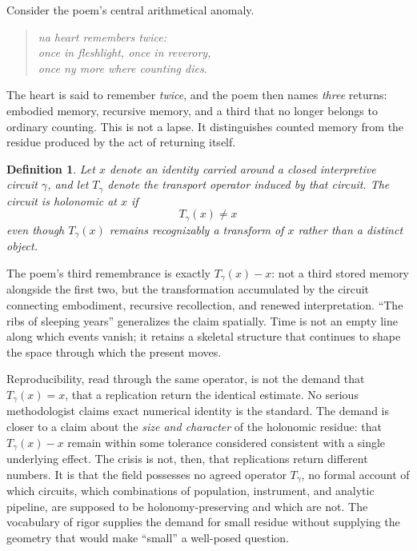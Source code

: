 \documentclass[11pt]{article}
\newtheorem{definition}{Definition}
\begin{document}
Consider the poem's central arithmetical anomaly.

\begin{quote}
\itshape
na heart remembers twice:\\
once in fleshlight, once in reverory,\\
once ny more where counting dies.
\end{quote}

The heart is said to remember \emph{twice}, and the poem then names \emph{three} returns: embodied memory, recursive memory, and a third that no longer belongs to ordinary counting. This is not a lapse. It distinguishes counted memory from the residue produced by the act of returning itself.

\begin{definition}
Let $x$ denote an identity carried around a closed interpretive circuit $\gamma$, and let $T_\gamma$ denote the transport operator induced by that circuit. The circuit is holonomic at $x$ if
\[
T_\gamma(x) \neq x
\]
even though $T_\gamma(x)$ remains recognizably a transform of $x$ rather than a distinct object.
\end{definition}

The poem's third remembrance is exactly $T_\gamma(x) - x$: not a third stored memory alongside the first two, but the transformation accumulated by the circuit connecting embodiment, recursive recollection, and renewed interpretation. ``The ribs of sleeping years'' generalizes the claim spatially. Time is not an empty line along which events vanish; it retains a skeletal structure that continues to shape the space through which the present moves.

Reproducibility, read through the same operator, is not the demand that $T_\gamma(x) = x$, that a replication return the identical estimate. No serious methodologist claims exact numerical identity is the standard. The demand is closer to a claim about the \emph{size and character} of the holonomic residue: that $T_\gamma(x) - x$ remain within some tolerance considered consistent with a single underlying effect. The crisis is not, then, that replications return different numbers. It is that the field possesses no agreed operator $T_\gamma$, no formal account of which circuits, which combinations of population, instrument, and analytic pipeline, are supposed to be holonomy-preserving and which are not. The vocabulary of rigor supplies the demand for small residue without supplying the geometry that would make ``small'' a well-posed question.
\end{document}
